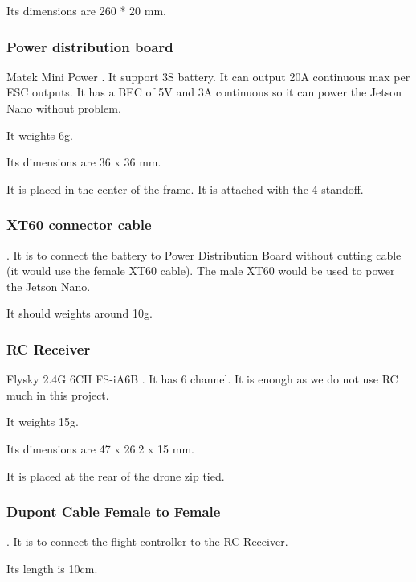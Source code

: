 Its dimensions are 260 * 20 mm.

\subsubsection{Power distribution board}
Matek Mini Power \cite{bangood_pdb}. It support 3S battery. It can output 20A continuous max per ESC outputs. It has a BEC of 5V and 3A continuous so it can power the Jetson Nano without problem.

It weights 6g.

Its dimensions are 36 x 36 mm.

It is placed in the center of the frame. It is attached with the 4 standoff.

\subsubsection{XT60 connector cable}
\cite{bangood_xt60_cable}. It is to connect the battery to Power Distribution Board without cutting cable (it would use the female XT60 cable). The male XT60 would be used to power the Jetson Nano.

It should weights around 10g.

\subsubsection{RC Receiver}
Flysky 2.4G 6CH FS-iA6B \cite{bangood_receiver}. It has 6 channel. It is enough as we do not use RC much in this project.

It weights 15g.

Its dimensions are 47 x 26.2 x 15 mm.

It is placed at the rear of the drone zip tied.

\subsubsection{Dupont Cable Female to Female}
\cite{bangood_dupont_cable}. It is to connect the flight controller to the RC Receiver.

Its length is 10cm.

